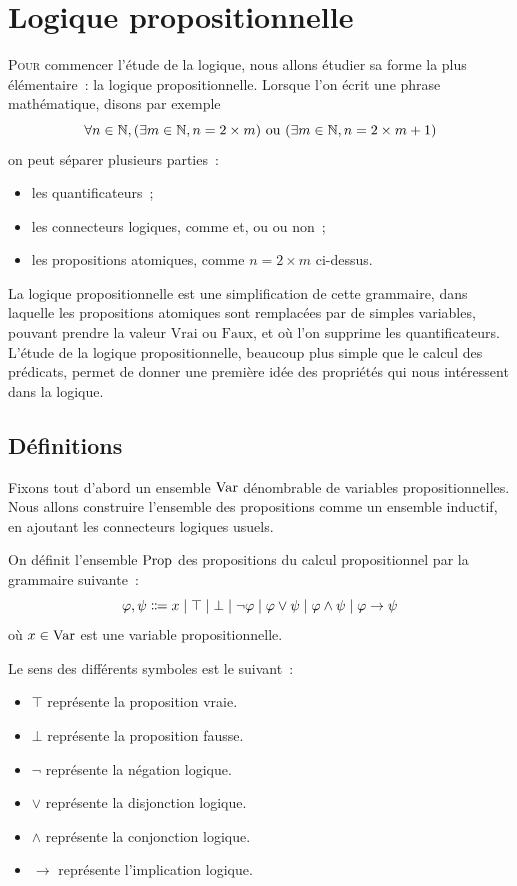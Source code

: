 \chapter{Logique propositionnelle}
\label{chp.logprop}

\minitoc

\lettrine{P}{our} commencer l'étude de la logique, nous allons étudier sa forme
la plus élémentaire~: la logique propositionnelle. Lorsque l'on écrit une phrase
mathématique, disons par exemple
\[\forall n \in \mathbb N, (\exists m \in \mathbb N, n = 2\times m) \text{ ou }
(\exists m \in \mathbb N, n = 2 \times m + 1)\]
on peut séparer plusieurs parties~:
\begin{itemize}
\item les quantificateurs~;
\item les connecteurs logiques, comme \og et\fg{}, \og ou\fg{} ou \og non\fg{}~;
\item les propositions atomiques, comme $n = 2 \times m$ ci-dessus.
\end{itemize}

La logique propositionnelle est une simplification de cette grammaire, dans
laquelle les propositions atomiques sont remplacées par de simples variables,
pouvant prendre la valeur $\mathrm{Vrai}$ ou $\mathrm{Faux}$, et où l'on
supprime les quantificateurs. L'étude de la logique propositionnelle, beaucoup
plus simple que le calcul des prédicats, permet de donner une première idée des
propriétés qui nous intéressent dans la logique.

\section{Définitions}

Fixons tout d'abord un ensemble $\operatorname{Var}$ dénombrable de variables
propositionnelles. Nous allons construire l'ensemble des propositions comme un
ensemble inductif, en ajoutant les connecteurs logiques usuels.

\begin{definition}[Propositions]
  On définit l'ensemble $\operatorname{Prop}$ des propositions du calcul
  propositionnel par la grammaire suivante~:
  \[\varFF,\varFP \inddefeq
  x \mid \top \mid \bot \mid \lnot \varFF \mid \varFF \lor \varFP \mid
  \varFF \land \varFP
  \mid \varFF \to \varFP\]
  où $x\in \operatorname{Var}$ est une variable propositionnelle.
\end{definition}

Le sens des différents symboles est le suivant~:
\begin{itemize}
\item $\top$ représente la proposition vraie.
\item $\bot$ représente la proposition fausse.
\item $\lnot$ représente la négation logique.
\item $\lor$ représente la disjonction logique.
\item $\land$ représente la conjonction logique.
\item $\to$ représente l'implication logique.
\end{itemize}

